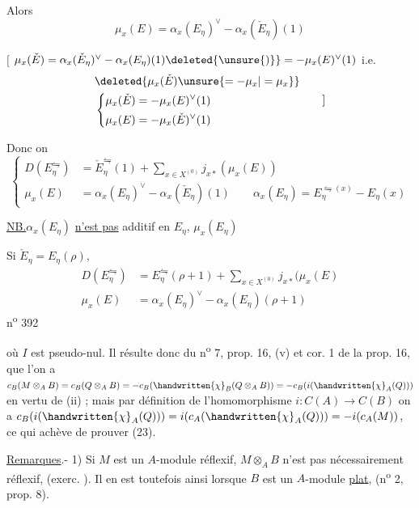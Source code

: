 Alors
\[
\boxed{\mu_x(E)=\alpha_x(E_\eta)^\vee-\alpha_x(\check E_\eta)(1)}
\]

$[$ $\mu_x(\check E)=\alpha_x(\check E_\eta)^\vee-\alpha_x(E_\eta)(1)\deleted{\unsure{)}}=-\mu_x(E)^\vee(1)$ i.e.
\[
\begin{aligned}
&\deleted{\mu_x(\check E)\unsure{=-\mu_x|=\mu_x}}\\
&\left\{\begin{aligned}
\mu_x(\check E)&=-\mu_x(E)^\vee(1)\\
\mu_x(E)&=-\mu_x(\check E)^\vee(1)
\end{aligned}\right.
\end{aligned}\qquad ]
\]

Donc on 
\[
\boxed{\left\{\begin{aligned}
D(E_\eta^{\leftrightharpoons})&=\check E_\eta^{\leftrightharpoons}(1)+\sum_{x\in X^{(0)}}j_{x*}(\mu_x(E))\\
\mu_x(E)&=\alpha_x(E_\eta)^\vee-\alpha_x(\check E_\eta)(1)\qquad
\alpha_x(E_\eta)=E_\eta^{\leftrightharpoons(x)}-E_\eta(x)
\end{aligned}\right.}
\]

\uline{NB.}\quad $\alpha_x(E_\eta)$ \uline{n'est pas} additif en $E_\eta$,  $\mu_x(E_\eta)$ 

Si $\check E_\eta=E_\eta(\rho)$, 
\[
\boxed{\begin{aligned}
D(E_\eta^{\leftrightharpoons})&=E_\eta^{\leftrightharpoons}(\rho+1)+\sum_{x\in X^{(0)}}j_{x*}(\mu_x(E)\\
\mu_x(E)&=\alpha_x(E_\eta)^\vee-\alpha_x(E_\eta)(\rho+1)
\end{aligned}}
\]
n\textsuperscript{o} 392

où $I$ est pseudo-nul. Il résulte donc du n\textsuperscript{o} 7, prop. 16, (v) et cor. 1 de la prop. 16, que l'on a $c_B(M\otimes_A B)=c_B(Q\otimes_A B)=-c_B(\handwritten{\chi}_B(Q\otimes_A B))=-c_B(i(\handwritten{\chi}_A(Q)))$ en vertu de (ii) ; mais par définition de l'homomorphisme $i:C(A)\longrightarrow C(B)$ on a $c_B(i(\handwritten{\chi}_A(Q)))=i(c_A(\handwritten{\chi}_A(Q)))=-i(c_A(M))$, ce qui achève de prouver (23).

\uline{Remarques}.- 1) Si $M$ est un $A$-module réflexif, $M\otimes_A B$ n'est pas nécessairement réflexif, (exerc. \quad). Il en est toutefois ainsi lorsque $B$ est un $A$-module \uline{plat}, (n\textsuperscript{o} 2, prop. 8).

